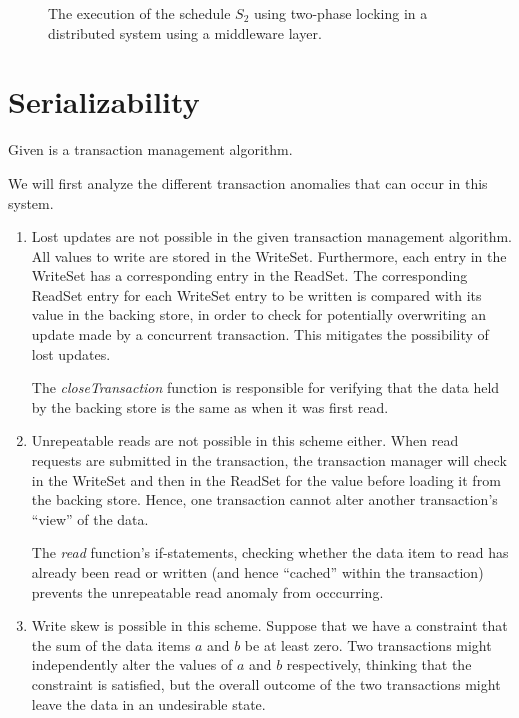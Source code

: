 \documentclass{article}
\begin{document}
\begin{enumerate}
\begin{figure}[ht]
            \caption{
                The execution of the schedule $S_2$ using two-phase locking in
                a distributed system using a middleware layer.
            }
            \label{fig:execution-s2}
        \end{figure}
\end{enumerate}

\section{Serializability}

Given is a transaction management algorithm.

We will first analyze the different transaction anomalies that can occur in
this system.

\begin{enumerate}
    \item
        Lost updates are not possible in the given transaction management
        algorithm.  All values to write are stored in the WriteSet.
        Furthermore, each entry in the WriteSet has a corresponding entry in
        the ReadSet. The corresponding ReadSet entry for each WriteSet entry to
        be written is compared with its value in the backing store, in order to
        check for potentially overwriting an update made by a concurrent
        transaction. This mitigates the possibility of lost updates.

        The \emph{closeTransaction} function is responsible for verifying that
        the data held by the backing store is the same as when it was first
        read.

    \item
        Unrepeatable reads are not possible in this scheme either. When read
        requests are submitted in the transaction, the transaction manager will
        check in the WriteSet and then in the ReadSet for the value before
        loading it from the backing store. Hence, one transaction cannot alter
        another transaction's ``view'' of the data.

        The \emph{read} function's if-statements, checking whether the data
        item to read has already been read or written (and hence ``cached''
        within the transaction) prevents the unrepeatable read anomaly from
        occcurring.

    \item
        Write skew is possible in this scheme. Suppose that we have a
        constraint that the sum of the data items $a$ and $b$ be at least zero.
        Two transactions might independently alter the values of $a$ and $b$
        respectively, thinking that the constraint is satisfied, but the
        overall outcome of the two transactions might leave the data in an
        undesirable state.


\end{enumerate}
\end{document}
